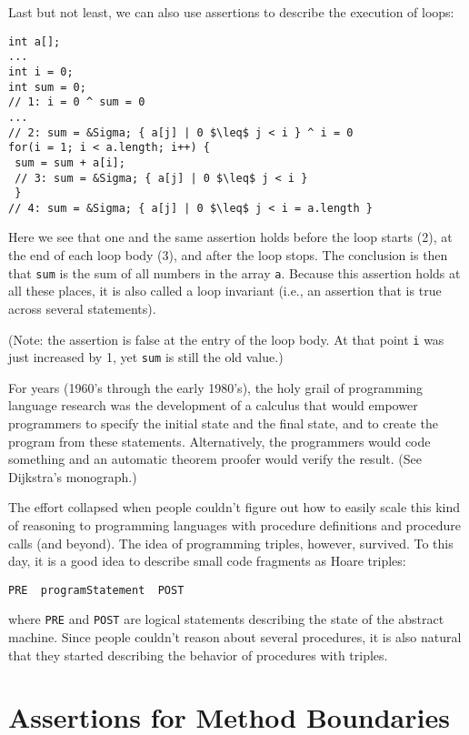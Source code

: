 \documentclass[11pt]{article}
\begin{document}
Last but not least, we can also use assertions to describe the execution
 of loops: 
\begin{verbatim}
int a[];
...
int i = 0; 
int sum = 0; 
// 1: i = 0 ^ sum = 0 
...
// 2: sum = &Sigma; { a[j] | 0 $\leq$ j < i } ^ i = 0
for(i = 1; i < a.length; i++) {
 sum = sum + a[i]; 
 // 3: sum = &Sigma; { a[j] | 0 $\leq$ j < i }
 }
// 4: sum = &Sigma; { a[j] | 0 $\leq$ j < i = a.length }
\end{verbatim}

Here we see that one and the same assertion holds before the loop starts
(2), at the end of each loop body (3), and after the loop stops. The
conclusion is then that {\tt sum} is the sum of all numbers in the
array {\tt a}. Because this assertion holds at all these places, it
is also called a loop invariant (i.e., an assertion that is true across
several statements). 


(Note: the assertion is false at the entry of the loop body. At that
  point {\tt i} was just increased by 1, yet {\tt sum} is
  still the old value.)


For years (1960's through the early 1980's), the holy grail of
  programming language research was the development of a calculus that
  would empower programmers to specify the initial state and the final
  state, and to create the program from these statements. Alternatively,
  the programmers would code something and an automatic theorem proofer
  would verify the result. (See Dijkstra's monograph.)


The effort collapsed when people couldn't figure out how to easily scale
  this kind of reasoning to programming languages with procedure
  definitions and procedure calls (and beyond). The idea of programming
  triples, however, survived. To this day, it is a good idea to describe
  small code fragments as Hoare triples: 

\begin{center}{\tt PRE { programStatement } POST}\end{center}

where {\tt PRE} and {\tt POST} are logical statements
describing the state of the abstract machine. Since people couldn't reason
about several procedures, it is also natural that they started describing
the behavior of procedures with triples. 


\section{Assertions for Method Boundaries}
\end{document}
